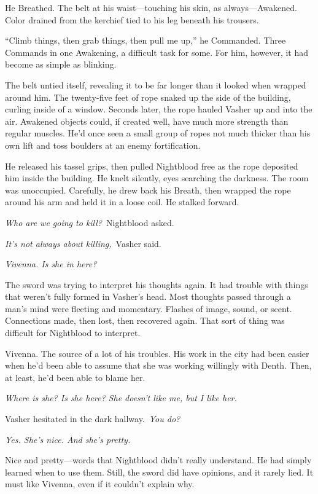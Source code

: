 He Breathed. The belt at his waist—touching his skin, as always—Awakened. Color drained from the kerchief tied to his leg beneath his trousers.

“Climb things, then grab things, then pull me up,” he Commanded. Three Commands in one Awakening, a difficult task for some. For him, however, it had become as simple as blinking.

The belt untied itself, revealing it to be far longer than it looked when wrapped around him. The twenty-five feet of rope snaked up the side of the building, curling inside of a window. Seconds later, the rope hauled Vasher up and into the air. Awakened objects could, if created well, have much more strength than regular muscles. He’d once seen a small group of ropes not much thicker than his own lift and toss boulders at an enemy fortification.

He released his tassel grips, then pulled Nightblood free as the rope deposited him inside the building. He knelt silently, eyes searching the darkness. The room was unoccupied. Carefully, he drew back his Breath, then wrapped the rope around his arm and held it in a loose coil. He stalked forward.

\textit{Who are we going to kill?}~Nightblood asked.

\textit{It’s not always about killing,}~Vasher said.

\textit{Vivenna. Is she in here?}

The sword was trying to interpret his thoughts again. It had trouble with things that weren’t fully formed in Vasher’s head. Most thoughts passed through a man’s mind were fleeting and momentary. Flashes of image, sound, or scent. Connections made, then lost, then recovered again. That sort of thing was difficult for Nightblood to interpret.

Vivenna. The source of a lot of his troubles. His work in the city had been easier when he’d been able to assume that she was working willingly with Denth. Then, at least, he’d been able to blame her.

\textit{Where is she? Is she here? She doesn’t like me, but I like her.}

Vasher hesitated in the dark hallway.~\textit{You do?}

\textit{Yes. She’s nice. And she’s pretty.}

Nice and pretty—words that Nightblood didn’t really understand. He had simply learned when to use them. Still, the sword did have opinions, and it rarely lied. It must like Vivenna, even if it couldn’t explain why.

